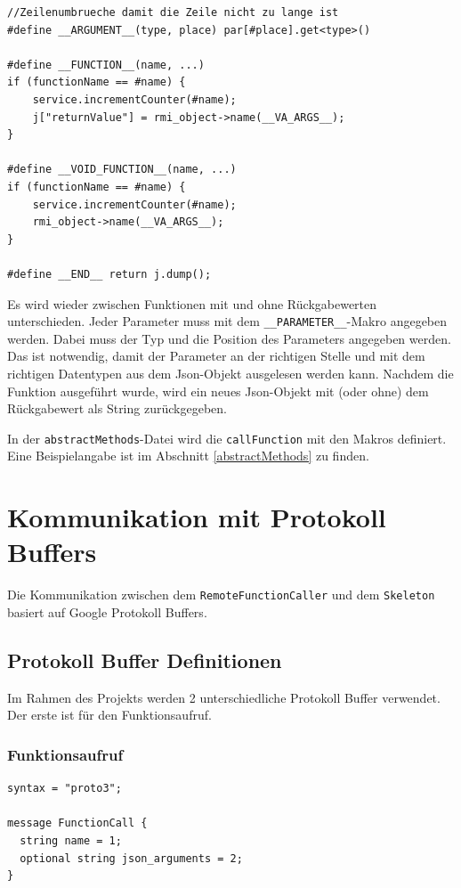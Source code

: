 \documentclass[a4paper,oneside,10pt]{report}
\begin{document}
\begin{lstlisting}
//Zeilenumbrueche damit die Zeile nicht zu lange ist
#define __ARGUMENT__(type, place) par[#place].get<type>()

#define __FUNCTION__(name, ...) 
if (functionName == #name) {
	service.incrementCounter(#name); 
	j["returnValue"] = rmi_object->name(__VA_ARGS__);
}

#define __VOID_FUNCTION__(name, ...) 
if (functionName == #name) {
	service.incrementCounter(#name); 
	rmi_object->name(__VA_ARGS__);
}

#define __END__ return j.dump();
\end{lstlisting}

Es wird wieder zwischen Funktionen mit und ohne Rückgabewerten unterschieden. Jeder Parameter muss mit dem \texttt{\_\_PARAMETER\_\_}-Makro angegeben werden. Dabei muss der Typ und die Position des Parameters angegeben werden. Das ist notwendig, damit der Parameter an der richtigen Stelle und mit dem richtigen Datentypen aus dem Json-Objekt ausgelesen werden kann. Nachdem die Funktion ausgeführt wurde, wird ein neues Json-Objekt mit (oder ohne) dem Rückgabewert als String zurückgegeben. 

In der \texttt{abstractMethods}-Datei wird die \texttt{callFunction} mit den Makros definiert. Eine Beispielangabe ist im Abschnitt \ref{abstractMethods} zu finden. 

\section{Kommunikation mit Protokoll Buffers} \label{kommunikation}

Die Kommunikation zwischen dem \texttt{RemoteFunctionCaller} und dem \texttt{Skeleton} basiert auf Google Protokoll Buffers.  

\subsection{Protokoll Buffer Definitionen}

Im Rahmen des Projekts werden 2 unterschiedliche Protokoll Buffer verwendet. Der erste ist für den Funktionsaufruf. 

\subsubsection{Funktionsaufruf}

\begin{lstlisting}
syntax = "proto3";

message FunctionCall {
  string name = 1;
  optional string json_arguments = 2;
}
\end{lstlisting}
\end{document}
